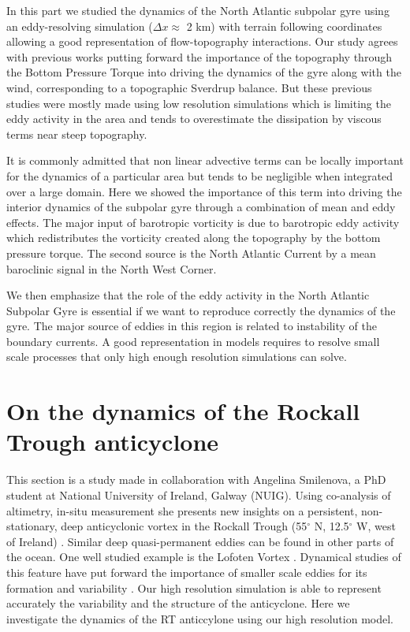 \documentclass[11pt,a4paper]{article}
\begin{document}
In this part we studied the dynamics of the North Atlantic subpolar gyre using an eddy-resolving simulation ($\Delta x \approx$ 2 km) with terrain following coordinates allowing a good representation of flow-topography interactions. Our study agrees with previous works putting forward the importance of the topography through the Bottom Pressure Torque into driving the dynamics of the gyre along with the wind, corresponding to a topographic Sverdrup balance. But these previous studies were mostly made using low resolution simulations which is limiting the eddy activity in the area and tends to overestimate the dissipation by viscous terms near steep topography.

It is commonly admitted that non linear advective terms can be locally important for the dynamics of a particular area but tends to be negligible when integrated over a large domain. Here we showed the importance of this term into driving the interior dynamics of the subpolar gyre through a combination of mean and eddy effects. The major input of barotropic vorticity is due to barotropic eddy activity which redistributes the vorticity created along the topography by the bottom pressure torque. The second source is the North Atlantic Current by a mean baroclinic signal in the North West Corner.

We then emphasize that the role of the eddy activity in the North Atlantic Subpolar Gyre is essential if we want to reproduce correctly the dynamics of the gyre. The major source of eddies in this region is related to instability of the boundary currents. A good representation in models requires to resolve small scale processes that only high enough resolution simulations can solve.

\section{On the dynamics of the Rockall Trough anticyclone}
 
This section is a study made in collaboration with Angelina Smilenova, a PhD student at National University of Ireland, Galway (NUIG). Using co-analysis of altimetry, in-situ measurement she presents new insights on a persistent, non-stationary, deep anticyclonic vortex in the Rockall Trough (55$^{\circ}$ N, 12.5$^{\circ}$ W, west of Ireland) \citep{smilenova}. Similar deep quasi-permanent eddies can be found in other parts of the ocean. One well studied example is the Lofoten Vortex \citep{kohl,raj}. Dynamical studies of this feature have put forward the importance of smaller scale eddies for its formation and variability \cite{volkov15}. Our high resolution simulation is able to represent accurately the variability and the structure of the anticyclone. Here we investigate the dynamics of the RT anticcylone using our high resolution model.
\end{document}
